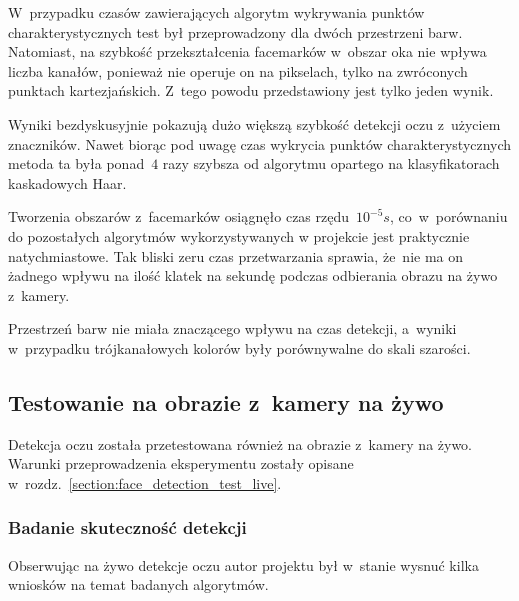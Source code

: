 \par 

W~przypadku czasów zawierających algorytm wykrywania punktów charakterystycznych test był przeprowadzony dla dwóch przestrzeni barw. Natomiast, na szybkość przekształcenia facemarków w~obszar oka nie wpływa liczba kanałów, ponieważ nie operuje on na pikselach, tylko na zwróconych punktach kartezjańskich. Z~tego powodu przedstawiony jest tylko jeden wynik.



\par

Wyniki bezdyskusyjnie pokazują dużo większą szybkość detekcji oczu z~użyciem znaczników. Nawet biorąc pod uwagę czas wykrycia punktów charakterystycznych metoda ta była ponad~$4$ razy szybsza od algorytmu opartego na klasyfikatorach kaskadowych Haar. 

\par

Tworzenia obszarów z~facemarków osiągnęło czas rzędu~$10^{-5}s$, co~w~porównaniu do pozostałych algorytmów wykorzystywanych w projekcie jest praktycznie natychmiastowe. Tak bliski zeru czas przetwarzania sprawia, że~nie ma on żadnego wpływu na ilość klatek na sekundę podczas odbierania obrazu na żywo z~kamery.

\par

Przestrzeń barw nie miała znaczącego wpływu na czas detekcji, a~wyniki w~przypadku trójkanałowych kolorów były porównywalne do skali szarości.




\subsection{Testowanie na obrazie z~kamery na żywo}

Detekcja oczu została przetestowana również na obrazie z~kamery na żywo. Warunki przeprowadzenia eksperymentu zostały opisane w~rozdz.~\hyperref[{section:face_detection_test_live}]{\ref{section:face_detection_test_live}}.

\subsubsection{Badanie skuteczność detekcji}

Obserwując na żywo detekcje oczu autor projektu był w~stanie wysnuć kilka wniosków na temat badanych algorytmów.

